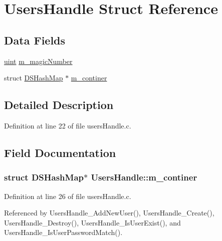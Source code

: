 \hypertarget{structUsersHandle}{}\section{Users\+Handle Struct Reference}
\label{structUsersHandle}
\subsection*{Data Fields}
\begin{DoxyCompactItemize}
\item 
\hyperlink{tcp_8h_a91ad9478d81a7aaf2593e8d9c3d06a14}{uint} \hyperlink{structUsersHandle_a9f927935bd48bcc7e161705148612c81}{m\+\_\+magic\+Number}
\item 
struct \hyperlink{structDSHashMap}{D\+S\+Hash\+Map} $\ast$ \hyperlink{structUsersHandle_a618ddbf05ed9dbfc16f858dd7f0a89fa}{m\+\_\+continer}
\end{DoxyCompactItemize}


\subsection{Detailed Description}


Definition at line 22 of file users\+Handle.\+c.



\subsection{Field Documentation}
\subsubsection[{\texorpdfstring{m\+\_\+continer}{m_continer}}]{\setlength{\rightskip}{0pt plus 5cm}struct {\bf D\+S\+Hash\+Map}$\ast$ Users\+Handle\+::m\+\_\+continer}\hypertarget{structUsersHandle_a618ddbf05ed9dbfc16f858dd7f0a89fa}{}\label{structUsersHandle_a618ddbf05ed9dbfc16f858dd7f0a89fa}


Definition at line 26 of file users\+Handle.\+c.



Referenced by Users\+Handle\+\_\+\+Add\+New\+User(), Users\+Handle\+\_\+\+Create(), Users\+Handle\+\_\+\+Destroy(), Users\+Handle\+\_\+\+Is\+User\+Exist(), and Users\+Handle\+\_\+\+Is\+User\+Password\+Match().

